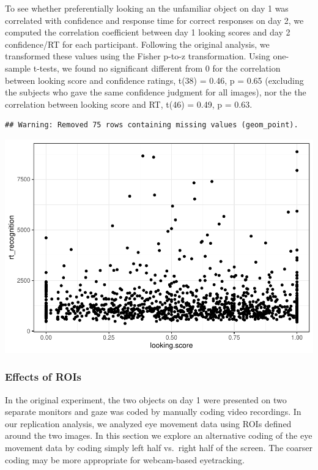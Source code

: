 \documentclass[
  man,floatsintext]{apa6}
\begin{document}
To see whether preferentially looking an the unfamiliar object on day 1 was correlated with confidence and response time for correct responses on day 2, we computed the correlation coefficient between day 1 looking scores and day 2 confidence/RT for each participant. Following the original analysis, we transformed these values using the Fisher p-to-z transformation. Using one-sample t-tests, we found no significant different from 0 for the correlation between looking score and confidence ratings, t(38) = 0.46, p = 0.65 (excluding the subjects who gave the same confidence judgment for all images), nor the the correlation between looking score and RT, t(46) = 0.49, p = 0.63.

\begin{verbatim}
## Warning: Removed 75 rows containing missing values (geom_point).
\end{verbatim}

\includegraphics{manuscript_files/figure-latex/Plot Looking Score Correlations-1.pdf}

\hypertarget{effects-of-rois}{%
\subsubsection{Effects of ROIs}\label{effects-of-rois}}

In the original experiment, the two objects on day 1 were presented on two separate monitors and gaze was coded by manually coding video recordings. In our replication analysis, we analyzed eye movement data using ROIs defined around the two images. In this section we explore an alternative coding of the eye movement data by coding simply left half vs.~right half of the screen. The coarser coding may be more appropriate for webcam-based eyetracking.
\end{document}

